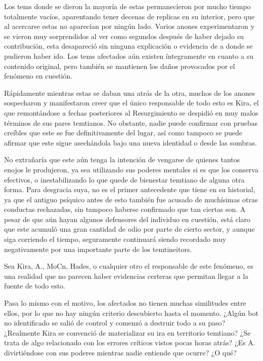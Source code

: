 \documentclass[
  spanish,
]{book}
\begin{document}
Los tems donde se dieron la mayoría de estas permanecieron por mucho tiempo totalmente vacíos, aparentando tener decenas de replicas en su interior, pero que al acercarse estas no aparecían por ningún lado. Varios anones experimentaron y se vieron muy sorprendidos al ver como segundos después de haber dejado su contribución, esta desapareció sin ninguna explicación o evidencia de a donde se pudieron haber ido. Los tems afectados aún existen íntegramente en cuanto a su contenido original, pero también se mantienen los daños provocados por el fenómeno en cuestión.

Rápidamente mientras estas se daban una atrás de la otra, muchos de los anones sospecharon y manifestaron creer que el único responsable de todo esto es Kira, el que remontándose a fechas posteriores al Resurgimiento se despidió en muy malos términos de sus pares temtianos. No obstante, nadie puede confirmar con pruebas creíbles que este se fue definitivamente del lugar, así como tampoco se puede afirmar que este sigue asechándola bajo una nueva identidad o desde las sombras.

No extrañaría que este aún tenga la intención de vengarse de quienes tantos enojos le produjeron, ya sea utilizando sus poderes mentales si es que los conserva efectivos, o inestabilizando lo que quede de bienestar temtiano de alguna otra forma. Para desgracia suya, no es el primer antecedente que tiene en su historial, ya que el antiguo psíquico antes de esto también fue acusado de muchísimas otras conductas rechazadas, sin tampoco haberse confirmado que tan ciertas son. A pesar de que aún hayan algunos defensores del individuo en cuestión, está claro que este acumuló una gran cantidad de odio por parte de cierto sector, y aunque siga corriendo el tiempo, seguramente continuará siendo recordado muy negativamente por una importante parte de los temtineitors.

Sea Kira, A., MoCn, Hades, o cualquier otro el responsable de este fenómeno, es una realidad que no parecen haber evidencias certeras que permitan llegar a la fuente de todo esto.

Pasa lo mismo con el motivo, los afectados no tienen muchas similitudes entre ellos, por lo que no hay ningún criterio descubierto hasta el momento. ¿Algún bot no identificado se salió de control y comenzó a destruir todo a su paso? ¿Realmente Kira se convenció de materializar su ira en territorio temtiano? ¿Se trata de algo relacionado con los errores críticos vistos pocas horas atrás? ¿Es A. divirtiéndose con sus poderes mientras nadie entiende que ocurre? ¿O qué?
\end{document}

